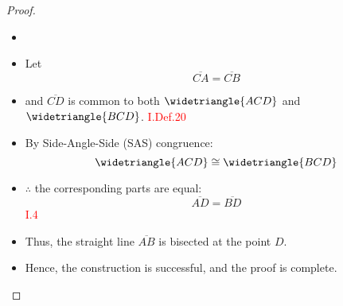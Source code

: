 \begin{proof}

\begin{itemize}

\item[]

\item Let 
\[\overline{CA} = \overline{CB}\] 

\item and $\overline{CD}$ is common to both $\widetriangle{ACD}$ and $\widetriangle{BCD}$.\hfill\textcolor{red}{ I.Def.20}

\item By Side-Angle-Side (SAS) congruence:
\[\widetriangle{ACD} \cong \widetriangle{BCD}\]

\item{$\therefore$} the corresponding parts are equal:
\[\overline{AD} = \overline{BD}\] \hfill\textcolor{red}{I.4}

\item Thus, the straight line $\overline{AB}$ is bisected at the point $D$.

\item Hence, the construction is successful, and the proof is complete.

\end{itemize}

\end{proof}
